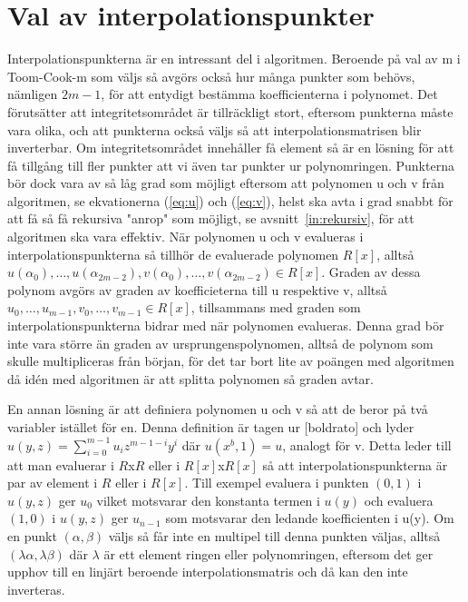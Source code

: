 \section{Val av interpolationspunkter}
Interpolationspunkterna är en intressant del i algoritmen. Beroende på val av m
i Toom-Cook-m som väljs så avgörs också hur många punkter som behövs, nämligen
$2m-1$, för att entydigt bestämma koefficienterna i polynomet. Det förutsätter
att integritetsområdet är tillräckligt stort, eftersom punkterna måste vara
olika, och att punkterna också väljs så att interpolationsmatrisen blir
inverterbar. Om integritetsområdet innehåller få element så är en lösning för
att få tillgång till fler punkter att vi även tar punkter ur polynomringen.
Punkterna bör dock vara av så låg grad som möjligt eftersom att polynomen u och
v från algoritmen, se ekvationerna (\ref {eq:u}) och (\ref{eq:v}), helst ska
avta i grad snabbt för att få så få rekursiva "anrop" som möjligt, se
avsnitt~\ref{in:rekursiv}, för att algoritmen ska vara effektiv. När polynomen
u och v evalueras i interpolationspunkterna så tillhör de evaluerade polynomen
$R[x]$, alltså
$u(\alpha_0),\dots,u(\alpha_{2m-2}),v(\alpha_0),\dots,v(\alpha_{2m-2}) \in
R[x]$. Graden av dessa polynom avgörs av graden av koefficieterna till u
respektive v, alltså $u_0,\dots,u_{m-1},v_0,\dots,v_{m-1} \in R[x]$,
tillsammans med graden som interpolationspunkterna bidrar med när polynomen
evalueras. Denna grad bör inte vara större än graden av ursprungenspolynomen,
alltså de polynom som skulle multipliceras från början, för det tar bort lite
av poängen med algoritmen då idén med algoritmen är att splitta polynomen så
graden avtar.

En annan lösning är att definiera polynomen u och v så att de beror på två
variabler istället för en. Denna definition är tagen ur [boldrato] och lyder
$u(y,z) = \displaystyle\sum\limits_{i=0}^{m-1} {u_iz^{m-1-i}y^i}$ där $u(x^b,1)
= u$, analogt för v. Detta leder till att man evaluerar i $R$x$R$ eller i
$R[x]$x$R[x]$ så att interpolationspunkterna är par av element i $R$ eller i
$R[x]$. Till exempel evaluera i punkten $(0,1)$ i $u(y,z)$ ger $u_0$ vilket
motsvarar den konstanta termen i $u(y)$ och evaluera $(1,0)$ i $u(y,z)$ ger
$u_{n-1}$ som motsvarar den ledande koefficienten i u(y). Om en punkt
$(\alpha,\beta)$ väljs så får inte en multipel till denna punkten väljas,
alltså $(\lambda\alpha,\lambda\beta)$ där $\lambda$ är ett element ringen eller
polynomringen, eftersom det ger upphov till en linjärt beroende
interpolationsmatris och då kan den inte inverteras.
